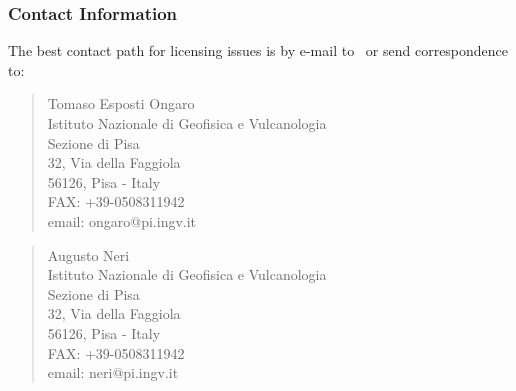 \subsubsection*{Contact Information}

The best contact path for licensing issues is by e-mail to \PDACADDRESS\ or send correspondence to:
\begin{verse}
                             Tomaso Esposti Ongaro\\
                             Istituto Nazionale di Geofisica e Vulcanologia\\
			     Sezione di Pisa\\
                             32, Via della Faggiola\\
			     56126, Pisa - Italy\\
                             FAX: +39-0508311942\\
                             email: ongaro@pi.ingv.it
\end{verse}
\begin{verse}
                             Augusto Neri\\
                             Istituto Nazionale di Geofisica e Vulcanologia\\
			     Sezione di Pisa\\
                             32, Via della Faggiola\\
			     56126, Pisa - Italy\\
                             FAX: +39-0508311942\\
                             email: neri@pi.ingv.it
\end{verse}


